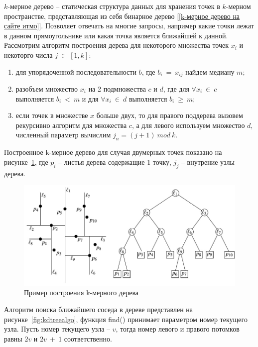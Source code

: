 \documentclass[14pt, a4paper]{extreport}
\begin{document}
	$k$-мерное дерево -- статическая структура данных для хранения точек в $k$-мерном пространстве, представляющая из себя бинарное дерево [\ref{k-мерное дерево на сайте итмо}]. Позволяет отвечать на многие запросы, например какие точки лежат в данном прямоугольнике или какая точка является ближайшей к данной. Рассмотрим алгоритм построения дерева для некоторого множества точек $x_i$ и некоторго числа $j~\in~[1, k]$:
	\begin{enumerate}[label={\arabic*)}]
		\item для упорядоченной последовательности $b$, где $b_i~=~x_{ij}$ найдем медиану $m$;
		\item разобъем множество $x_i$ на 2 подмножества $c$ и $d$, где для $\forall x_i~\in~c$ выполняется $b_i~<~m$ и для $\forall x_i~\in~d$ выполняется $b_i~\ge~m$;
		\item если точек в множестве $x$ больше двух, то для правого поддерева вызовем рекурсивно алгоритм для множества $c$, а для левого используем множество $d$, численный параметр вычислим $j_{n}=(j + 1)~mod~k$. 
	\end{enumerate}
	 Построенное k-мерное дерево для случая двумерных точек показано на рисунке~\ref{fig:kdtreeexample}, где $p_i$ -- листья дерева содержащие 1 точку, $j_j$ -- внутрение узлы дерева.
	
	\begin{figure}[h!]
		\centering
		\includegraphics[width = 13cm]{image/chapter_2/kdtreeexample}	
		\caption{Пример построения k-мерного дерева}
		\label{fig:kdtreeexample}
	\end{figure}
	
	Алгоритм поиска ближайшего соседа в дереве представлен на рисунке~\ref{fig:kdtreealgo}, функция find() принимает параметром номер текущего узла. Пусть номер текущего узла -- $v$, тогда номер левого и правого потомков равны $2v$ и $2v~+~1$ соответственно.
	
\end{document}
